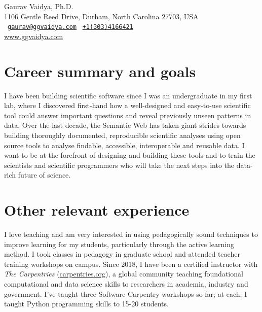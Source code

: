 \documentclass[12pt,letter]{article}
\begin{document}
\thispagestyle{plain}

\begin{center}

{\selectfont
\Large Gaurav Vaidya, Ph.D. \\
\small
1106 Gentle Reed Drive, Durham, North Carolina 27703, USA \\
\Letter~{\tt \href{mailto:gaurav@ggvaidya.com}{gaurav@ggvaidya.com}}
\hspace{0.25em}
\Telefon~{\tt \href{tel:+13034166421}{+1\hspace{0.3em}(303)\hspace{0.3em}416\hspace{0.3em}6421}\hspace{0.3em}} \\
\url{www.ggvaidya.com}
}

\vspace{-1em}

\end{center}

\normalfont

\selectfont

\part{Career summary and goals}

I have been building scientific software since I was an undergraduate in my first lab, where I discovered first-hand how a well-designed and easy-to-use scientific tool could answer important questions and reveal previously unseen patterns in data. Over the last decade, the Semantic Web has taken giant strides towards building thoroughly documented, reproducible scientific analyses using open source tools to analyse findable, accessible, interoperable and reusable data. I want to be at the forefront of designing and building these tools and to train the scientists and scientific programmers who will take the next steps into the data-rich future of science.





\part{Other relevant experience}

I love teaching and am very interested in using pedagogically sound techniques to improve learning for my students, particularly through the active learning method. I took classes in pedagogy in graduate school and attended teacher training workshops on campus. Since 2018, I have been a certified instructor with \textit{The Carpentries} (\href{https://carpentries.org/}{carpentries.org}), a global community teaching foundational computational and data science skills to researchers in academia, industry and government. I've taught three Software Carpentry workshops so far; at each, I taught Python programming skills to 15-20 students.
\end{document}
